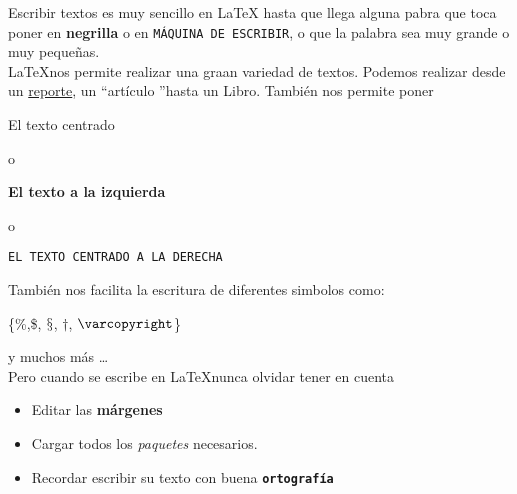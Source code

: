 


Escribir textos es muy sencillo en \LaTeX 
hasta que llega alguna pabra que toca poner en \textbf{negrilla}
o en \texttt{MÁQUINA DE ESCRIBIR}, o que la palabra sea muy {\tiny grande} o muy  {\Huge pequeñas}. \\ 

\LaTeX nos permite realizar una graan variedad de textos. Podemos realizar desde un \underline{reporte}, 
un \textquotedblleft artículo \textquotedblright hasta un {\large Libro}. También nos permite poner 

\begin{center}
    El texto centrado
\end{center}
o
\begin{flushleft}
    \textbf{\huge El texto a la izquierda}
\end{flushleft}
o
\begin{flushright}
    \texttt{EL TEXTO CENTRADO A LA DERECHA}
\end{flushright}
También nos facilita la escritura de diferentes simbolos como:
\begin{center}
    \{\%,\$, $\mathsection$, $\dagger$, $\varcopyright$\}
\end{center}
y muchos más \dots \\ 
Pero cuando se escribe en \LaTeX nunca olvidar tener en cuenta 
\begin{itemize}
    \item Editar las \textbf{\Huge márgenes}
    \item Cargar todos los \textit{\tiny paquetes} necesarios.
    \item Recordar escribir su texto con buena \textbf{\texttt{ortografía}}
\end{itemize}
